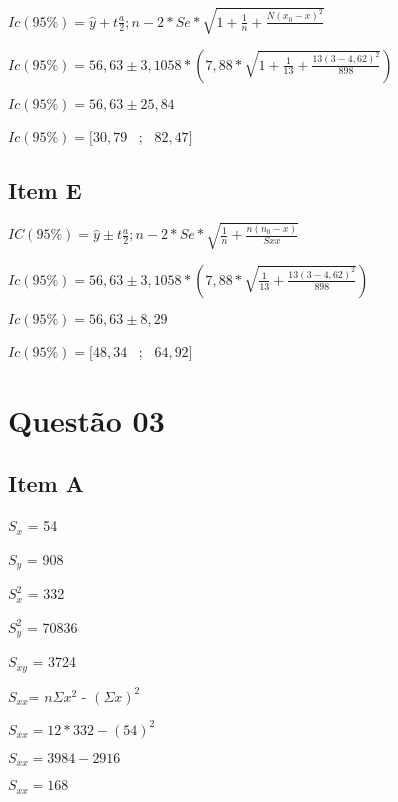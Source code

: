 \documentclass{article}
\begin{document}
            \begin{flushleft}
            $Ic(95\%) = \hat{y} + t\frac{a}{2};n-2 *Se* \sqrt{1 + \frac{1}{n} +\frac{N(x_0 -x)^2}{}}$

            $Ic(95\%) = 56,63 \pm 3,1058 *  (7,88* \sqrt{1 + \frac{1}{13} + \frac{13(3-4,62)^2}{898}})$

            $Ic(95\%) =  56,63 \pm 25,84$

            $Ic(95\%) = [30,79$ \ ; \ $82,47]$
    \end{flushleft}


    \subsection{Item E}

            \begin{flushleft}
            $IC(95\%) = \hat{y} \pm  t \frac{a}{2}; n-2 *Se * \sqrt{\frac{1}{n} + \frac{n(n_0 - x)}{Sxx}}$ 

            $Ic(95\%) = 56,63 \pm 3,1058 *  (7,88* \sqrt{\frac{1}{13} + \frac{13(3-4,62)^2}{898}})$

            $Ic(95\%) =  56,63 \pm 8,29$

            $Ic(95\%) = [48,34$ \ ; \ $64,92]$

            \end{flushleft}


\section{Questão 03}    

    \subsection*{Item A}

            $S_x$ = 54
            
            $S_y$ = 908
            
            $S_x^2$ = 332
            
            $S_y^2$ = 70836
            
            $S_{xy}$ = 3724

            \begin{flushleft}

            $S_{xx}$= $n\Sigma x^2$ - $(\Sigma x)^2$ 

            $S_{xx} =12*332 -(54)^2$

            $S_{xx} = 3984 -2916 $

            $S_{xx}= 168$

            \end{flushleft}
\end{document}
